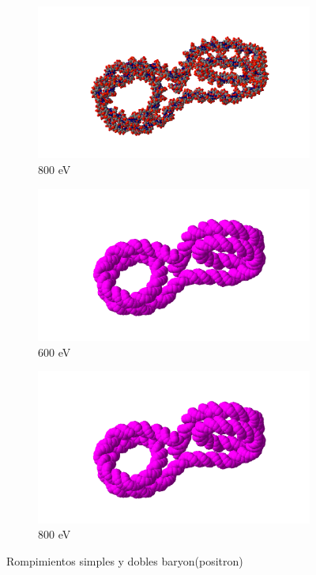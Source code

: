 \begin{figure}
\begin{subfigure}{.5\textwidth}
  \includegraphics[width=.78\linewidth]{./Figures/bavdw.png}
  \caption{800 eV}
  \label{fig:sub44}
\end{subfigure}
\begin{subfigure}{.5\textwidth}
  \centering
  \includegraphics[width=.78\linewidth]{./Figures/a.png}
  \caption{600 eV}
  \label{fig:sub55}
\end{subfigure}%
\begin{subfigure}{.5\textwidth}
  \centering
  \includegraphics[width=.78\linewidth]{./Figures/a.png}
  \caption{800 eV}
  \label{fig:sub66}
\end{subfigure}
\caption[Rompimientos simples y dobles electrón(positron)]{Rompimientos simples y dobles baryon(positron)}
\end{figure}




